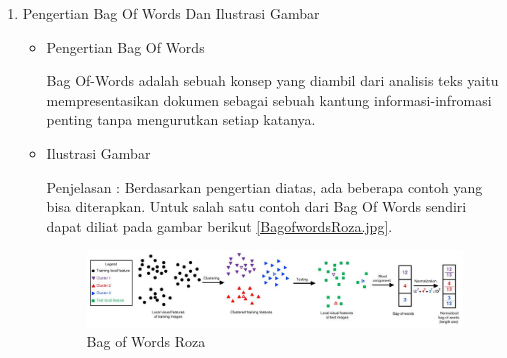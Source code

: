 \begin{enumerate}
\item Pengertian Bag Of Words Dan Ilustrasi Gambar
\begin{itemize}
\item  Pengertian Bag Of Words
\par Bag Of-Words adalah sebuah konsep yang diambil dari analisis teks yaitu mempresentasikan dokumen sebagai sebuah kantung informasi-infromasi penting tanpa mengurutkan setiap katanya.
\par
\item Ilustrasi Gambar
\par Penjelasan : Berdasarkan pengertian diatas, ada beberapa contoh yang bisa diterapkan. Untuk salah satu contoh dari Bag Of Words sendiri dapat diliat pada gambar berikut \ref{BagofwordsRoza.jpg}.
\begin{figure}[!hbtp]
\centering
\includegraphics[scale=0.2]{figures/BagofwordsRoza.jpg}
\caption{Bag of Words Roza}
\label{bag-fadila}
\end{figure}
\par
\end{itemize}
\par
\par


\end{enumerate}
